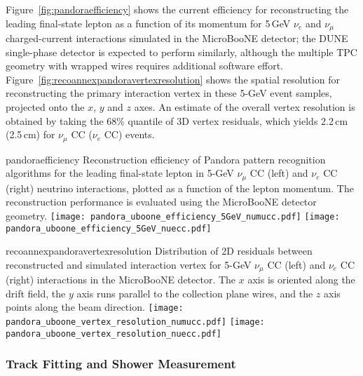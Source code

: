 Figure~\ref{fig:pandoraefficiency} shows the current efficiency for reconstructing
the leading final-state lepton as a function of its momentum
for 5\,GeV $\nu_{e}$ and $\nu_{\mu}$ charged-current interactions
simulated in the MicroBooNE detector; the DUNE single-phase detector is expected to 
perform similarly, although the multiple TPC geometry with wrapped wires requires
additional software effort.
Figure~\ref{fig:recoannexpandoravertexresolution} shows the spatial resolution for
reconstructing the primary interaction vertex in these 5-GeV event samples,
projected onto the $x$, $y$ and $z$ axes. An estimate of the overall vertex 
resolution is obtained by taking the 68\% quantile of 3D vertex residuals, 
which yields 2.2\,cm (2.5\,cm) for $\nu_{\mu}$ CC ($\nu_{e}$ CC) events.

\begin{cdrfigure}{pandoraefficiency}
{Reconstruction efficiency of Pandora pattern recognition algorithms
 for the leading final-state lepton in 5-GeV $\nu_{\mu}$ CC (left) and
 $\nu_{e}$ CC (right) neutrino interactions, plotted as a function of
 the lepton momentum. The reconstruction performance is evaluated
 using the MicroBooNE detector geometry. }
\texttt{[image: pandora\_uboone\_efficiency\_5GeV\_numucc.pdf]}
\texttt{[image: pandora\_uboone\_efficiency\_5GeV\_nuecc.pdf]}
\end{cdrfigure}

\begin{cdrfigure}{recoannexpandoravertexresolution}
{Distribution of 2D residuals between reconstructed and simulated interaction
 vertex for 5-GeV $\nu_{\mu}$ CC (left) and $\nu_{e}$ CC (right) interactions in the MicroBooNE detector.
 The $x$ axis is oriented along the drift field, the $y$ axis runs parallel 
 to the collection plane wires, and the $z$ axis points along the beam direction.}
\texttt{[image: pandora\_uboone\_vertex\_resolution\_numucc.pdf]}
\texttt{[image: pandora\_uboone\_vertex\_resolution\_nuecc.pdf]}
\end{cdrfigure}

\subsubsection{Track Fitting and Shower Measurement}

